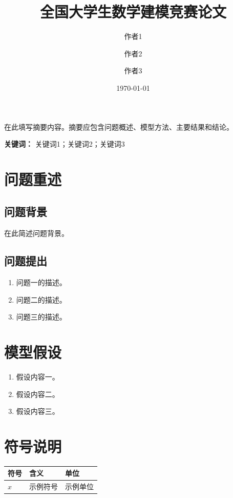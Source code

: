 \documentclass[withoutpreface]{cumcmthesis}
\title{全国大学生数学建模竞赛论文}
\author{作者1 \and 作者2 \and 作者3}
\date{\today}
\renewenvironment{abstract}{%
  \small
  \begin{center}%
    {\bfseries\abstractname\vspace{-.5em}}%
  \end{center}%
  \par\noindent\ignorespaces
}{%
  \par
}
\begin{document}
\maketitle

\begin{abstract}
在此填写摘要内容。摘要应包含问题概述、模型方法、主要结果和结论。
\par\textbf{关键词：} 关键词1；关键词2；关键词3
\end{abstract}

\tableofcontents
\newpage

\section{问题重述}
\subsection{问题背景}
在此简述问题背景。

\subsection{问题提出}
\begin{enumerate}[label=(\arabic*)]
    \item 问题一的描述。
    \item 问题二的描述。
    \item 问题三的描述。
\end{enumerate}

\section{模型假设}
\begin{enumerate}[label=\textbf{假设\arabic*：}]
    \item 假设内容一。
    \item 假设内容二。
    \item 假设内容三。
\end{enumerate}

\section{符号说明}
\begin{table}[H]
\centering
\begin{tabular}{lll}
\toprule
\textbf{符号} & \textbf{含义} & \textbf{单位} \\
\midrule
$x$ & 示例符号 & 示例单位 \\
\bottomrule
\end{tabular}
\end{table}
\end{document}
